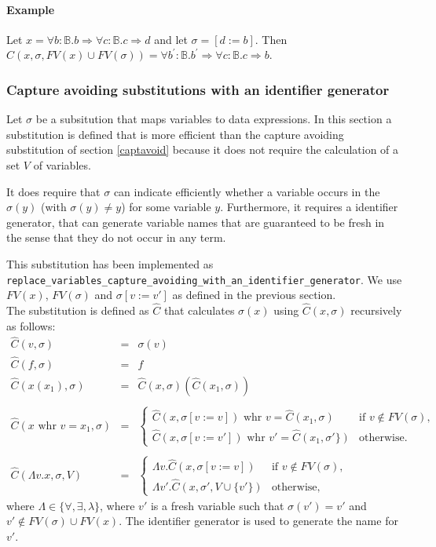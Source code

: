 \documentclass{article}
\begin{document}
\paragraph{Example}

Let $x=\forall b{:}\mathbb{B}. b\Rightarrow \forall c{:}\mathbb{B}.c\Rightarrow d$
and let $\sigma =[d:=b]$. Then $C(x,\sigma ,FV(x)\cup FV(\sigma ))=\forall
b^{\prime }{:}\mathbb{B}.b^{\prime }\Rightarrow \forall c{:}\mathbb{B}%
.c\Rightarrow b$.

\subsubsection{Capture avoiding substitutions with an identifier generator}
Let $\sigma$ be a subsitution that maps variables to data expressions.
In this section a substitution is defined that is more efficient than the capture avoiding substitution
of section \ref{captavoid} because it does not require the calculation of a set $V$ of variables.

It does require that $\sigma$ can indicate efficiently whether a variable occurs in the $\sigma(y)$
(with $\sigma(y)\not=y$) for some variable $y$. Furthermore, it requires a identifier generator, that
can generate variable names that are guaranteed to be fresh in the sense that they do not occur in any
term. 

This substitution has been implemented as \texttt{replace\_variables\_capture\_avoiding\_with\_an\_identifier\_generator}.
We use $\mathit{FV}(x)$, $\mathit{FV}(\sigma)$ and $\sigma[v:=v']$ as defined in the previous section. 
\vspace{2ex}\\
The substitution is defined as $\hat{C}$ that calculates $\sigma(x)$ using $\hat{C}(x,\sigma)$ recursively 
as follows:
\[
\begin{array}{lll}
\hat{C}(v,\sigma) & = & \sigma (v) \\
\hat{C}(f,\sigma) & = & f \\
\hat{C}(x(x_{1}),\sigma) & = & \hat{C}(x,\sigma)(\hat{C}(x_{1},\sigma)) \\
&  &  \\
\hat{C}(x\text{ whr }v=x_{1},\sigma) & = & \left\{
\begin{array}{ll}
\hat{C}(x,\sigma[v:=v])\text{ whr }v=\hat{C}(x_{1},\sigma)&\text{if }%
v\notin \mathit{FV}(\sigma), \\
\hat{C}(x,\sigma[v:=v'] )\text{ whr }v'=\hat{C}(x_{1},\sigma'\})&\text{otherwise}.%
\end{array}%
\right.  \\
&  &  \\
\hat{C}(\Lambda v.x,\sigma ,V) & = & \left\{
\begin{array}{ll}
\Lambda v.\hat{C}(x,\sigma[v:=v] )&\text{if }v\notin \mathit{FV}(\sigma), \\
\Lambda v'.\hat{C}(x,\sigma',V\cup \{v'\})&\text{otherwise,}%
\end{array}%
\right.
\end{array}%
\]%
where $\Lambda \in \{\forall ,\exists ,\lambda \}$, where $v'$ is
a fresh variable such that $\sigma (v')=v'$ and $%
v'\notin \mathit{FV}(\sigma)\cup\mathit{FV}(x)$. The identifier generator is
used to generate the name for $v'$.
\end{document}
